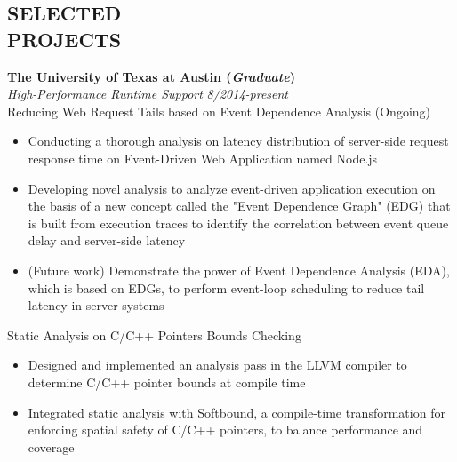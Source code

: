 \documentclass[margin, 9pt]{res} %
\begin{document}
\begin{resume}

\section{SELECTED\\ PROJECTS}

{\large\textbf{The University of Texas at Austin (\textit{Graduate})}}\\

\vspace*{-7pt}
{\large\textit{High-Performance Runtime Support}} \hfill\textit{8/2014-present}\\

\vspace*{-7pt}
Reducing Web Request Tails based on Event Dependence Analysis \hfill(Ongoing)\\
\vspace*{-10pt}
\begin{itemize}[leftmargin=*] \itemsep -3pt
\vspace*{-5pt}
	\item Conducting a thorough analysis on latency distribution of server-side request response time on Event-Driven Web Application named Node.js
	\item Developing novel analysis to analyze event-driven application execution on the basis of a new concept called the "Event Dependence Graph" (EDG) that is built from execution traces to identify the correlation between event queue delay and server-side latency 
	\item (Future work) Demonstrate the power of Event Dependence Analysis (EDA), which is based on EDGs, to perform event-loop scheduling to reduce tail latency in server systems
\end{itemize}

\medskip
Static Analysis on C/C++ Pointers Bounds Checking\\
\vspace*{-10pt}
\begin{itemize}[leftmargin=*] \itemsep -3pt
\vspace*{-5pt}
	\item Designed and implemented an analysis pass in the LLVM compiler to determine C/C++ pointer bounds at compile time
	\item Integrated static analysis with Softbound, a compile-time transformation for enforcing spatial safety of C/C++ pointers, to balance performance and coverage
\end{itemize}


\end{resume}
\end{document}

